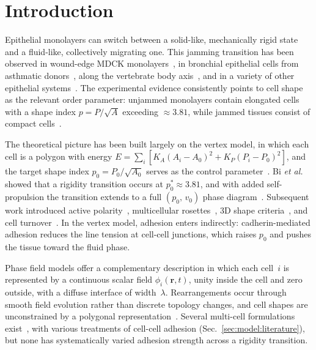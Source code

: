\documentclass[aps,pre,twocolumn,superscriptaddress,longbibliography,floatfix]{revtex4-2}
\newcommand{\phii}{\phi_i}                 %
\begin{document}
\maketitle

\section{Introduction}
\label{sec:intro}

Epithelial monolayers can switch between a solid-like, mechanically rigid
state and a fluid-like, collectively migrating one.  This jamming transition
has been observed in wound-edge MDCK
monolayers~\cite{Angelini2011,Garcia2015}, in bronchial epithelial cells
from asthmatic donors~\cite{Park2015}, along the vertebrate body
axis~\cite{Mongera2018}, and in a variety of other epithelial
systems~\cite{Atia2018,Malinverno2017}.  The experimental evidence
consistently points to cell shape as the relevant order parameter: unjammed
monolayers contain elongated cells with a shape index $p = P/\sqrt{A}$
exceeding $\approx 3.81$, while jammed tissues consist of compact
cells~\cite{Park2015,Atia2018}.

The theoretical picture has been built largely on the vertex model, in
which each cell is a polygon with energy
$E = \sum_i[K_A(A_i - A_0)^2 + K_P(P_i - P_0)^2]$, and the target shape
index $p_0 = P_0/\sqrt{A_0}$ serves as the control
parameter~\cite{NagaiHonda2001,Farhadifar2007,Staple2010,Fletcher2014}.
Bi \textit{et al.}~\cite{Bi2015} showed that a rigidity transition occurs at
$p_0^* \approx 3.81$, and with added self-propulsion the transition extends
to a full $(p_0,\,v_0)$ phase diagram~\cite{Bi2016}.  Subsequent work
introduced active polarity~\cite{Barton2017}, multicellular
rosettes~\cite{YanBi2019}, 3D shape criteria~\cite{MerkelManning2018},
and cell turnover~\cite{Czajkowski2019}.  In the vertex model, adhesion
enters indirectly: cadherin-mediated adhesion reduces the line tension at
cell-cell junctions, which raises $p_0$ and pushes the tissue toward the
fluid phase.

Phase field models offer a complementary description in which each cell~$i$
is represented by a continuous scalar field $\phii(\bm{r},t)$, unity inside
the cell and zero outside, with a diffuse interface of width~$\lambda$.
Rearrangements occur through smooth field evolution rather than discrete
topology changes, and cell shapes are unconstrained by a polygonal
representation~\cite{Camley2017,AlertTrepat2020}.  Several multi-cell
formulations exist~\cite{Nonomura2012,Palmieri2015,Lober2015,Najem2016},
with various treatments of cell-cell adhesion
(Sec.~\ref{sec:model:literature}), but none has systematically varied
adhesion strength across a rigidity transition.
\end{document}
